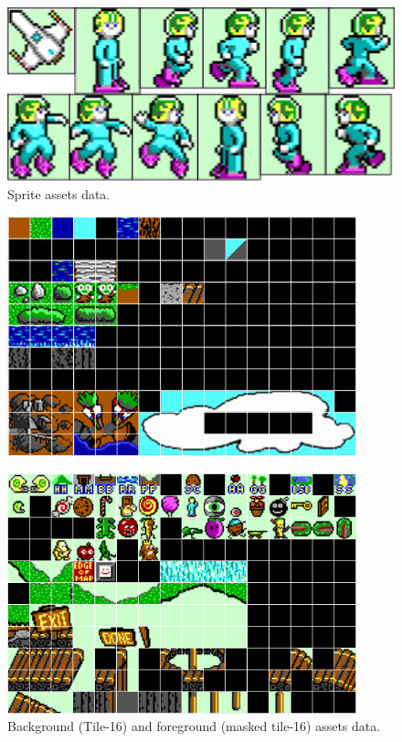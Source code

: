 \documentclass[book.tex]{subfiles}
\begin{document}
\begin{figure}[H] 
  \centering 
  \includegraphics[width=1.0\textwidth, frame]{screenshots_300dpi/sprite_assets.png}
  \caption{Sprite assets data.}
  \label{fig:sprite_assets}
\end{figure} 

\begin{figure}[H] 
  \centering 
  \includegraphics[width=0.9\textwidth, frame]{screenshots_300dpi/tile16_assets.png}
\end{figure} 

\begin{figure}[H] 
  \centering 
  \includegraphics[width=0.9\textwidth, frame]{screenshots_300dpi/tile16M_assets.png}
  \caption{Background (Tile-16) and foreground (masked tile-16) assets data.}
  \label{fig:tile16_assets}
\end{figure} 
\end{document}
